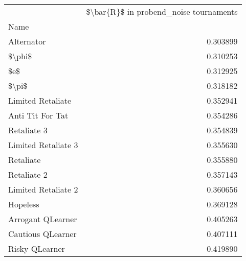 \begin{tabular}{lr}
\toprule
{} &  \$\textbackslash bar\{R\}\$ in probend\_noise tournaments \\
Name                &                                         \\
\midrule
Alternator          &                                0.303899 \\
\$\textbackslash phi\$              &                                0.310253 \\
\$e\$                 &                                0.312925 \\
\$\textbackslash pi\$               &                                0.318182 \\
Limited Retaliate   &                                0.352941 \\
Anti Tit For Tat    &                                0.354286 \\
Retaliate 3         &                                0.354839 \\
Limited Retaliate 3 &                                0.355630 \\
Retaliate           &                                0.355880 \\
Retaliate 2         &                                0.357143 \\
Limited Retaliate 2 &                                0.360656 \\
Hopeless            &                                0.369128 \\
Arrogant QLearner   &                                0.405263 \\
Cautious QLearner   &                                0.407111 \\
Risky QLearner      &                                0.419890 \\
\bottomrule
\end{tabular}

